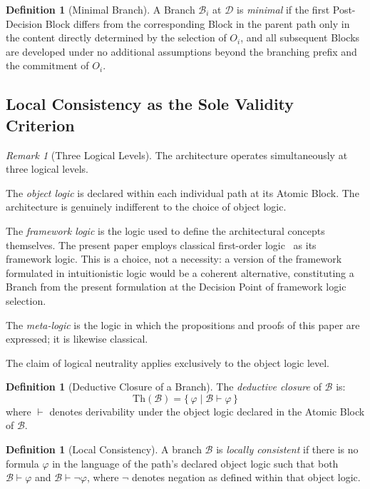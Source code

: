 \documentclass[12pt, a4paper]{article}
\theoremstyle{plain}
\theoremstyle{definition}
\newtheorem{definition}[theorem]{Definition}
\theoremstyle{remark}
\newtheorem{remark}[theorem]{Remark}
\newcommand{\Th}[1]{\mathrm{Th}(#1)}
\begin{document}
\begin{definition}[Minimal Branch]
\label{def:minimal-branch}
A Branch $\mathcal{B}_i$ at $\mathcal{D}$ is \emph{minimal} if
the first Post-Decision Block differs from the corresponding
Block in the parent path only in the content directly determined by
the selection of $O_i$, and all subsequent Blocks are developed under
no additional assumptions beyond the branching prefix and the
commitment of $O_i$.
\end{definition}

\subsection{Local Consistency as the Sole Validity Criterion}
\label{subsec:local}

\begin{remark}[Three Logical Levels]
\label{rem:three-levels}
The architecture operates simultaneously at three logical levels.

The \emph{object logic} is declared within each individual path
at its Atomic Block. The architecture is genuinely indifferent
to the choice of object logic.

The \emph{framework logic} is the logic used to define the
architectural concepts themselves. The present paper employs
classical first-order logic~\cite{Enderton2001,Shoenfield1967}
as its framework logic. This is a choice, not a necessity: a
version of the framework formulated in intuitionistic logic would
be a coherent alternative, constituting a Branch from the present
formulation at the Decision Point of framework logic selection.

The \emph{meta-logic} is the logic in which the propositions and
proofs of this paper are expressed; it is likewise classical.

The claim of logical neutrality applies exclusively to the object
logic level.
\end{remark}

\begin{definition}[Deductive Closure of a Branch]
\label{def:closure}
The \emph{deductive closure} of $\mathcal{B}$ is:
\[
  \Th{\mathcal{B}}
  = \{\,\varphi \mid \mathcal{B} \vdash \varphi\,\}
\]
where $\vdash$ denotes derivability under the object logic
declared in the Atomic Block of $\mathcal{B}$.
\end{definition}

\begin{definition}[Local Consistency]
\label{def:local-consistency}
A branch $\mathcal{B}$ is \emph{locally consistent} if there is
no formula $\varphi$ in the language of the path's declared
object logic such that both $\mathcal{B} \vdash \varphi$ and
$\mathcal{B} \vdash \neg\varphi$, where $\neg$ denotes negation
as defined within that object logic.
\end{definition}
\end{document}
